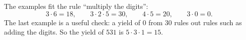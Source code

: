 The examples fit the rule ``multiply the digits'':
\[
3\cdot6=18,\qquad 3\cdot2\cdot5=30,\qquad 4\cdot5=20,\qquad 3\cdot0=0 .
\]
The last example is a useful check: a yield of $0$ from $30$ rules out rules such as adding the digits. So the yield of $531$ is $5\cdot3\cdot1=\boxed{15}$.

